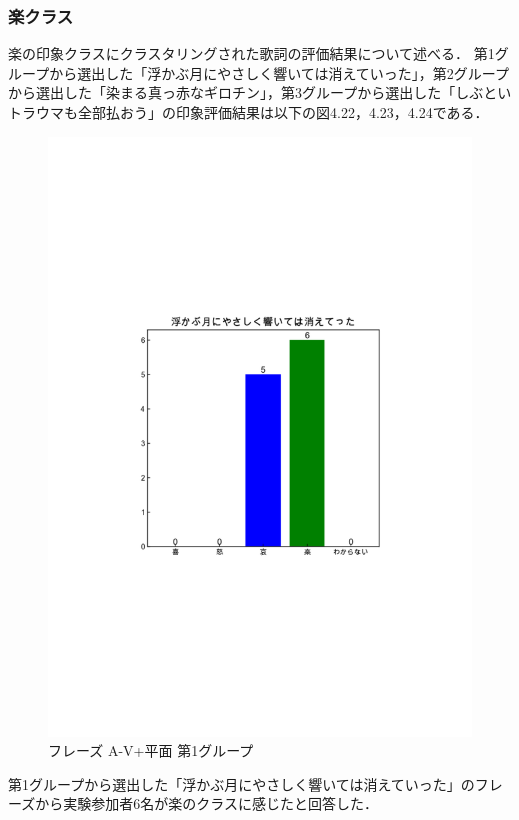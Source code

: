 \subsubsection{楽クラス}
楽の印象クラスにクラスタリングされた歌詞の評価結果について述べる．
第1グループから選出した「浮かぶ月にやさしく響いては消えていった」，第2グループから選出した「染まる真っ赤なギロチン」，第3グループから選出した「しぶといトラウマも全部払おう」の印象評価結果は以下の図4.22，4.23，4.24である．
\begin{figure}[H]
    \centering
    \includegraphics[width=14cm]{4310.pdf}
    \vspace{-1mm}
    \caption{フレーズ A-V+平面 第1グループ}
    \label{fig:mms}
    \vspace{5mm}
\end{figure}
第1グループから選出した「浮かぶ月にやさしく響いては消えていった」のフレーズから実験参加者6名が楽のクラスに感じたと回答した．
